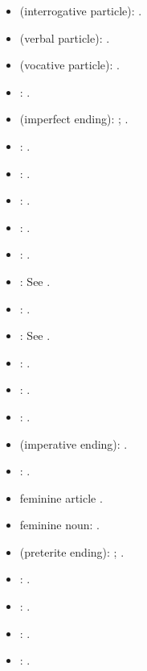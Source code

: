 \begin{itemize}
\item{} (interrogative particle): \textcite[\S\S 23, 196]{evans_grammar_1964}.
\item{} (verbal particle): \textcite[\S\S 23, 6, 192]{evans_grammar_1964}.
\item{} (vocative particle): \textcite[\S 19]{evans_grammar_1964}.
\item{}: \textcite[\S 20]{evans_grammar_1964}.
\item{} (imperfect ending): \textcite[\S 21]{evans_grammar_1964}; \textcite[42--45]{van_development14}.
\item{}: \textcite[\S 249]{evans_grammar_1964}.
\item{}: \textcite[\S 20]{evans_grammar_1964}.
\item{}: \textcite[\S 20]{evans_grammar_1964}.
\item{}: \textcite[\S 20]{evans_grammar_1964}.
\item{}: \textcite[\S 20]{evans_grammar_1964}.
\item{}: See .
\item{}: \textcite[\S\S 22, 43]{evans_grammar_1964}.
\item{}: See .
\item{}: \textcite[\S 20]{evans_grammar_1964}.
\item{}: \textcite[\S 20]{evans_grammar_1964}.
\item{}: \textcite[\S 20]{evans_grammar_1964}.
\item{} (imperative ending): \textcite[\S 21]{evans_grammar_1964}.
\item{}: \textcite[\S 20]{evans_grammar_1964}.
\item feminine article \textcite[\S 19]{evans_grammar_1964}.
\item feminine noun: \textcite[\S\S 19, 22]{evans_grammar_1964}.
\item{} (preterite ending): \textcite[\S 21]{evans_grammar_1964}; \textcite[50--51]{van_development14}.
\item{}: \textcite[\S 20]{evans_grammar_1964}.
\item{}: \textcite[\S 20]{evans_grammar_1964}.
\item{}: \textcite[\S 20]{evans_grammar_1964}.
\item{}: \textcite[\S 20]{evans_grammar_1964}.

\end{itemize}
